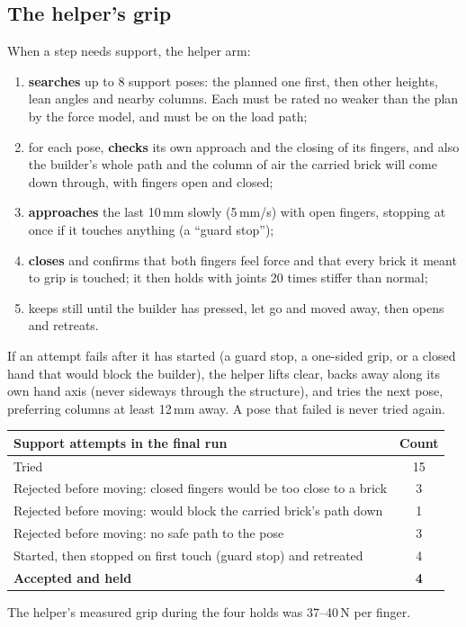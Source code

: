 \documentclass[11pt,a4paper]{article}
\begin{document}
\subsection{The helper's grip}\label{sec:helper}
When a step needs support, the helper arm:
\begin{enumerate}
\item \textbf{searches} up to 8 support poses: the planned one first, then other heights,
      lean angles and nearby columns. Each must be rated no weaker than the plan by the
      force model, and must be on the load path;
\item for each pose, \textbf{checks} its own approach and the closing of its fingers, and
      also the builder's whole path and the column of air the carried brick will come
      down through, with fingers open and closed;
\item \textbf{approaches} the last 10\,mm slowly (5\,mm/s) with open fingers, stopping at
      once if it touches anything (a ``guard stop'');
\item \textbf{closes} and confirms that both fingers feel force and that every brick it
      meant to grip is touched; it then holds with joints 20 times stiffer than normal;
\item keeps still until the builder has pressed, let go and moved away, then opens and
      retreats.
\end{enumerate}
If an attempt fails after it has started (a guard stop, a one-sided grip, or a
closed hand that would block the builder), the helper lifts clear, backs away
along its own hand axis (never sideways through the structure), and tries the
next pose, preferring columns at least 12\,mm away. A pose that failed is never
tried again.

\begin{center}
\small
\begin{tabular}{@{}lc@{}}
\toprule
Support attempts in the final run & Count \\
\midrule
Tried & 15 \\
Rejected before moving: closed fingers would be too close to a brick & 3 \\
Rejected before moving: would block the carried brick's path down & 1 \\
Rejected before moving: no safe path to the pose & 3 \\
Started, then stopped on first touch (guard stop) and retreated & 4 \\
\textbf{Accepted and held} & \textbf{4} \\
\bottomrule
\end{tabular}
\end{center}
The helper's measured grip during the four holds was 37--40\,N per finger.
\end{document}
